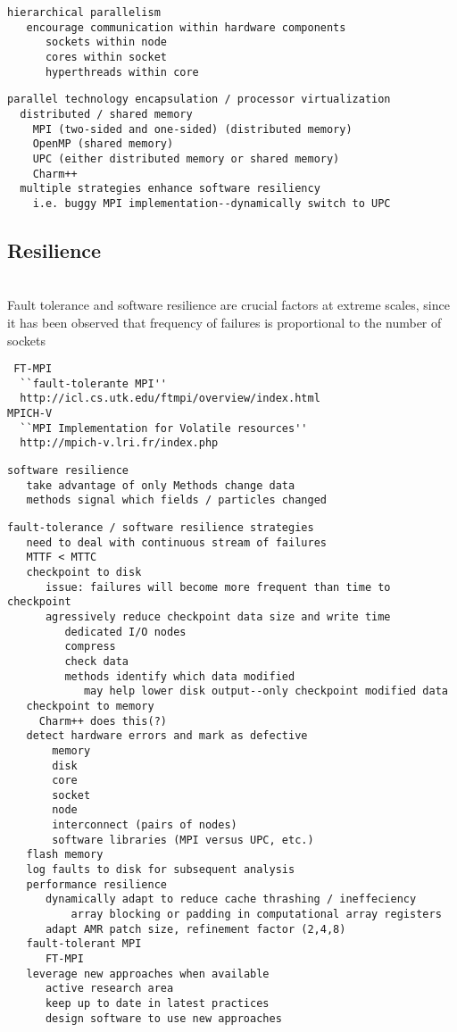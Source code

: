 \documentclass{article}
\begin{document}
\begin{verbatim}
hierarchical parallelism
   encourage communication within hardware components
      sockets within node
      cores within socket
      hyperthreads within core
\end{verbatim}

\begin{verbatim}
parallel technology encapsulation / processor virtualization
  distributed / shared memory
    MPI (two-sided and one-sided) (distributed memory)
    OpenMP (shared memory) 
    UPC (either distributed memory or shared memory)
    Charm++
  multiple strategies enhance software resiliency
    i.e. buggy MPI implementation--dynamically switch to UPC
\end{verbatim}

\subsection{Resilience} \label{ss:design-resilience}

\ \\  Fault tolerance and software
resilience are crucial factors at extreme scales, since it has been
observed that frequency of failures is proportional to the number of
sockets~\cite{@@@}

\begin{verbatim}
 FT-MPI 
  ``fault-tolerante MPI''
  http://icl.cs.utk.edu/ftmpi/overview/index.html 
MPICH-V 
  ``MPI Implementation for Volatile resources''
  http://mpich-v.lri.fr/index.php 
\end{verbatim}


\begin{verbatim}
software resilience
   take advantage of only Methods change data
   methods signal which fields / particles changed
\end{verbatim}
\begin{verbatim}
fault-tolerance / software resilience strategies
   need to deal with continuous stream of failures
   MTTF < MTTC
   checkpoint to disk
      issue: failures will become more frequent than time to checkpoint
      agressively reduce checkpoint data size and write time
         dedicated I/O nodes
         compress
         check data
         methods identify which data modified
            may help lower disk output--only checkpoint modified data
   checkpoint to memory
     Charm++ does this(?)
   detect hardware errors and mark as defective
       memory
       disk
       core
       socket
       node
       interconnect (pairs of nodes)
       software libraries (MPI versus UPC, etc.)
   flash memory
   log faults to disk for subsequent analysis
   performance resilience
      dynamically adapt to reduce cache thrashing / ineffeciency
          array blocking or padding in computational array registers
      adapt AMR patch size, refinement factor (2,4,8)
   fault-tolerant MPI
      FT-MPI
   leverage new approaches when available
      active research area
      keep up to date in latest practices
      design software to use new approaches
\end{verbatim}
\end{document}
